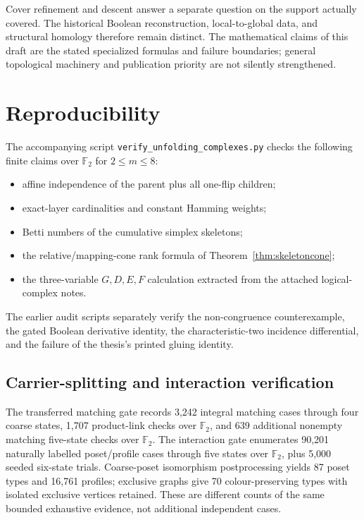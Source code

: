 \documentclass[11pt]{article}
\newcommand{\Ftwo}{\mathbb F_2}
\begin{document}
Cover refinement and descent answer a separate question on the support
actually covered.  The historical Boolean reconstruction, local-to-global
data, and structural homology therefore remain distinct.  The mathematical
claims of this draft are the stated specialized formulas and failure
boundaries; general topological machinery and publication priority are not
silently strengthened.

\appendix
\section{Reproducibility}
The accompanying script \texttt{verify\_unfolding\_complexes.py} checks the following finite claims over $\Ftwo$ for $2\le m\le8$:
\begin{itemize}
\item affine independence of the parent plus all one-flip children;
\item exact-layer cardinalities and constant Hamming weights;
\item Betti numbers of the cumulative simplex skeletons;
\item the relative/mapping-cone rank formula of Theorem~\ref{thm:skeletoncone};
\item the three-variable $G,D,E,F$ calculation extracted from the attached logical-complex notes.
\end{itemize}
The earlier audit scripts separately verify the non-congruence counterexample, the gated Boolean derivative identity, the characteristic-two incidence differential, and the failure of the thesis's printed gluing identity.

\subsection{Carrier-splitting and interaction verification}
The transferred matching gate records 3,242 integral matching cases through
four coarse states, 1,707 product-link checks over $\mathbb F_2$, and 639
additional nonempty matching five-state checks over $\mathbb F_2$.
The interaction gate enumerates 90,201 naturally labelled poset/profile
cases through five states over $\mathbb F_2$, plus 5,000 seeded six-state
trials.  Coarse-poset isomorphism postprocessing yields 87 poset types and
16,761 profiles; exclusive graphs give 70 colour-preserving types with
isolated exclusive vertices retained.  These are different counts of the
same bounded exhaustive evidence, not additional independent cases.
\end{document}
